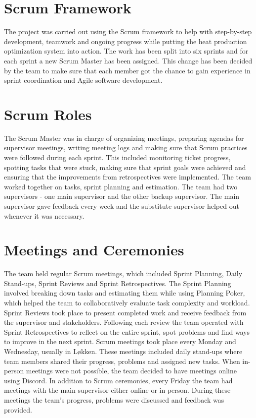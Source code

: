 \section{Scrum Framework}
The project was carried out using the Scrum framework to help with step-by-step development, teamwork and ongoing progress while putting the heat production optimization system into action. The work has been split into six sprints and for each sprint a new Scrum Master has been assigned. This change has been decided by the team to make sure that each member got the chance to gain experience in sprint coordination and Agile software development.

\section{Scrum Roles}
The Scrum Master was in charge of organizing meetings, preparing agendas for supervisor meetings, writing meeting logs and making sure that Scrum practices were followed during each sprint. This included monitoring ticket progress, spotting tasks that were stuck, making sure that sprint goals were achieved and ensuring that the improvements from retrospectives were implemented. The team worked together on tasks, sprint planning and estimation. The team had two supervisors - one main supervisor and the other backup supervisor. The main supervisor gave feedback every week and the substitute supervisor helped out whenever it was necessary.

\section{Meetings and Ceremonies}
The team held regular Scrum meetings, which included Sprint Planning, Daily Stand-ups, Sprint Reviews and Sprint Retrospectives. The Sprint Planning involved breaking down tasks and estimating them while using Planning Poker, which helped the team to collaboratively evaluate task complexity and workload. Sprint Reviews took place to present completed work and receive feedback from the supervisor and stakeholders. Following each review the team operated with Sprint Retrospectives to reflect on the entire sprint, spot problems and find ways to improve in the next sprint. Scrum meetings took place every Monday and Wednesday, usually in Løkken. These meetings included daily stand-ups where team members shared their progress, problems and assigned new tasks. When in-person meetings were not possible, the team decided to have meetings online using Discord. In addition to Scrum ceremonies, every Friday the team had meetings with the main supervisor either online or in person. During these meetings the team’s progress, problems were discussed and feedback was provided.
